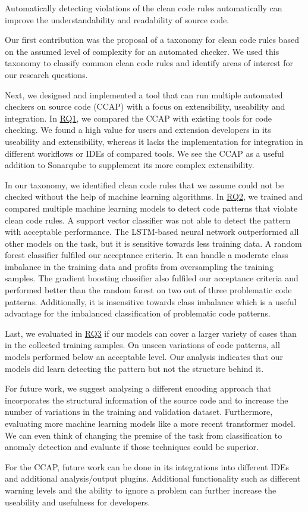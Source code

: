 

Automatically detecting violations of the clean code rules automatically can improve the understandability and readability of source code. 

Our first contribution was the proposal of a taxonomy for clean code rules based on the assumed level of complexity for an automated checker.
We used this taxonomy to classify common clean code rules and identify areas of interest for our research questions.

Next, we designed and implemented a tool that can run multiple automated checkers on source code (CCAP) with a focus on extensibility, useability and integration. In \hyperref[rq:1]{RQ1}, we compared the CCAP with existing tools for code checking. We found a high value for users and extension developers in its useability and extensibility, whereas it lacks the implementation for integration in different workflows or IDEs of compared tools. We see the CCAP as a useful addition to Sonarqube to supplement its more complex extensibility.

In our taxonomy, we identified clean code rules that we assume could not be checked without the help of machine learning algorithms. In \hyperref[rq:2]{RQ2}, we trained and compared multiple machine learning models to detect code patterns that violate clean code rules. A support vector classifier was not able to detect the pattern with acceptable performance. The LSTM-based neural network outperformed all other models on the task, but it is sensitive towards less training data.
A random forest classifier fulfiled our acceptance criteria. It can handle a moderate class imbalance in the training data and profits from oversampling the training samples. The gradient boosting classifier also fulfiled our acceptance criteria and performed better than the random forest on two out of three problematic code patterns. Additionally, it is insensitive towards class imbalance which is a useful advantage for the imbalanced classification of problematic code patterns.

Last, we evaluated in \hyperref[rq:3]{RQ3} if our models can cover a larger variety of cases than in the collected training samples. On unseen variations of code patterns, all models performed below an acceptable level. Our analysis indicates that our models did learn detecting the pattern but not the structure behind it.

\medskip
For future work, we suggest analysing a different encoding approach that incorporates the structural information of the source code and to increase the number of variations in the training and validation dataset. Furthermore, evaluating more machine learning models like a more recent transformer model. We can even think of changing the premise of the task from classification to anomaly detection and evaluate if those techniques could be superior.

For the CCAP, future work can be done in its integrations into different IDEs and additional analysis/output plugins. Additional functionality such as different warning levels and the ability to ignore a problem can further increase the useability and usefulness for developers.






